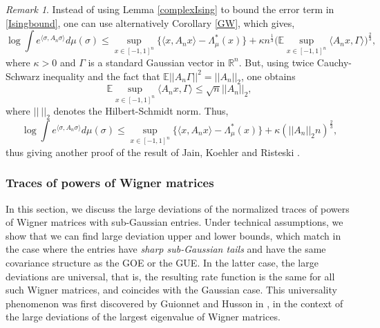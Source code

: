 \documentclass[aop,preprint]{imsart}
\newcommand\RR{\mathbb{R}}
\newcommand\EE{\mathbb{E}}
\numberwithin{equation}{section}
\theoremstyle{definition}
\theoremstyle{plain}
\theoremstyle{remark}
\newtheorem{Rem}[Def]{Remark}
\begin{document}
\begin{Rem}\label{remRonen}
Instead of using Lemma \ref{complexIsing} to bound the error term in \eqref{Isingbound}, one can use alternatively Corollary \ref{GW}, which gives, 
$$ \log \int e^{\langle \sigma, A_n \sigma\rangle} d\mu(\sigma) \leq \sup_{x\in [-1,1]^n}\{ \langle x, A_n x\rangle -\Lambda^*_{\mu}(x) \} +   \kappa n^{\frac{1}{3}} \big(\EE \sup_{x \in [-1,1]^n } \langle A_n x,\Gamma \rangle\big)^{\frac{2}{3}},$$
where $\kappa>0$ and $\Gamma$ is a standard Gaussian vector in $\RR^n$. But, using twice Cauchy-Schwarz inequality and the fact that $\EE || A_n \Gamma||^2 = ||A_n||_2$, one obtains
$$  \EE \sup_{x \in [-1,1]^n } \langle A_n x,\Gamma \rangle \leq \sqrt{n}||A_n||_2,$$
where $|| \ ||_2$ denotes the Hilbert-Schmidt norm. Thus, 
$$ \log \int e^{\langle \sigma, A_n \sigma\rangle} d\mu(\sigma) \leq \sup_{x\in [-1,1]^n}\{ \langle x, A_n x\rangle -\Lambda^*_{\mu}(x) \} + \kappa(||A_n||_2 n)^{\frac{2}{3}},$$
 thus giving another proof of the result of Jain, Koehler and Risteski \cite{JKR}.





\end{Rem}

\subsubsection{Traces of powers of Wigner matrices}

In this section, we discuss the large deviations of the normalized traces of powers of Wigner matrices with sub-Gaussian entries. Under technical assumptions, we show that we can find large deviation upper and lower bounds, which match in the case where the entries have \textit{sharp sub-Gaussian tails} and have the same covariance structure as the GOE or the GUE. In the latter case, the large deviations are universal, that is, the resulting rate function is the same for all such Wigner matrices, and coincides with the Gaussian case.   
This universality phenomenon was first discovered by Guionnet and Husson in \cite{GH}, in the context of the large deviations of the largest eigenvalue of Wigner matrices.
\end{document}
